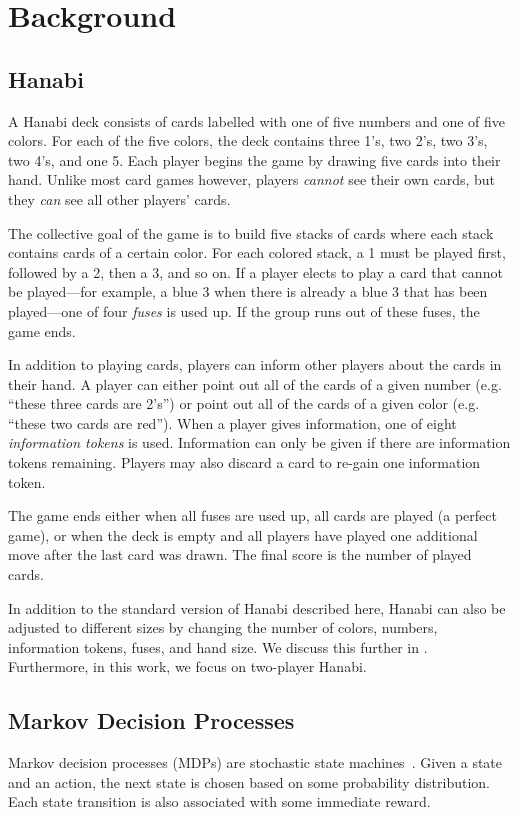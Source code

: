 \section{Background}\label{sec:background}

\subsection{Hanabi}\label{sec:background:hanabi}
A Hanabi deck consists of cards labelled with one of five numbers and one of
five colors. For each of the five colors, the deck contains three 1's, two 2's,
two 3's, two 4's, and one 5.  Each player begins the game by drawing five cards
into their hand. Unlike most card games however, players \emph{cannot} see
their own cards, but they \emph{can} see all other players' cards.

The collective goal of the game is to build five stacks of cards where each
stack contains cards of a certain color. For each colored stack, a 1 must be
played first, followed by a 2, then a 3, and so on. If a player elects to play
a card that cannot be played---for example, a blue 3 when there is already a
blue 3 that has been played---one of four \emph{fuses} is used up. If the group
runs out of these fuses, the game ends.

In addition to playing cards, players can inform other players about the cards
in their hand. A player can either point out all of the cards of a given number
(e.g. ``these three cards are 2's'') or point out all of the cards of a given
color (e.g. ``these two cards are red''). When a player gives information, one
of eight \emph{information tokens} is used. Information can only be given if
there are information tokens remaining. Players may also discard a card to
re-gain one information token.

The game ends either when all fuses are used up, all cards are played (a
perfect game), or when the deck is empty and all players have played one
additional move after the last card was drawn. The final score is the number of
played cards.

In addition to the standard version of Hanabi described here, Hanabi can also
be adjusted to different sizes by changing the number of colors, numbers,
information tokens, fuses, and hand size. We discuss this further in
.  Furthermore, in this work, we focus on
two-player Hanabi.

\subsection{Markov Decision Processes}\label{sec:background:mdp}
Markov decision processes (MDPs) are stochastic state machines~\cite{mdp}. Given
a state and an action, the next state is chosen based on some probability
distribution. Each state transition is also associated with some immediate
reward.

